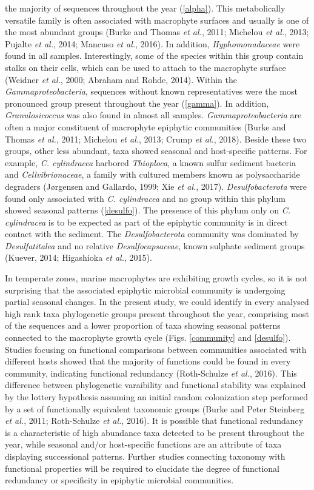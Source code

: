 \documentclass[12pt,]{article}
\begin{document}
the majority of sequences throughout the year (\autoref{alpha}). This
metabolically versatile family is often associated with macrophyte
surfaces and usually is one of the most abundant groups (Burke and
Thomas \emph{et al.}, 2011; Michelou \emph{et al.}, 2013; Pujalte
\emph{et al.}, 2014; Mancuso \emph{et al.}, 2016). In addition,
\emph{Hyphomonadaceae} were found in all samples. Interestingly, some of
the species within this group contain stalks on their cells, which can
be used to attach to the macrophyte surface (Weidner \emph{et al.},
2000; Abraham and Rohde, 2014). Within the \emph{Gammaproteobacteria},
sequences without known representatives were the most pronounced group
present throughout the year (\autoref{gamma}). In addition,
\emph{Granulosicoccus} was also found in almost all samples.
\emph{Gammaproteobacteria} are often a major constituent of macrophyte
epiphytic communities (Burke and Thomas \emph{et al.}, 2011; Michelou
\emph{et al.}, 2013; Crump \emph{et al.}, 2018). Beside these two
groups, other less abundant, taxa showed seasonal and host-specific
patterns. For example, \emph{C. cylindracea} harbored \emph{Thioploca},
a known sulfur sediment bacteria and \emph{Cellvibrionaceae}, a family
with cultured members known as polysaccharide degraders (Jørgensen and
Gallardo, 1999; Xie \emph{et al.}, 2017). \emph{Desulfobacterota} were
found only associated with \emph{C. cylindracea} and no group within
this phylum showed seasonal patterns (\autoref{desulfo}). The presence
of this phylum only on \emph{C. cylindracea} is to be expected as part
of the epiphytic community is in direct contact with the sediment. The
\emph{Desulfobacterota} community was dominated by \emph{Desulfatitalea}
and no relative \emph{Desulfocapsaceae}, known sulphate sediment groups
(Kuever, 2014; Higashioka \emph{et al.}, 2015).

In temperate zones, marine macrophytes are exhibiting growth cycles, so
it is not surprising that the associated epiphytic microbial community
is undergoing partial seasonal changes. In the present study, we could
identify in every analysed high rank taxa phylogenetic groups present
throughout the year, comprising most of the sequences and a lower
proportion of taxa showing seasonal patterns connected to the macrophyte
growth cycle (Figs. \ref{community} and \ref{desulfo}). Studies focusing
on functional comparisons between communities associated with different
hosts showed that the majority of functions could be found in every
community, indicating functional redundancy (Roth-Schulze \emph{et al.},
2016). This difference between phylogenetic varaibility and functional
stability was explained by the lottery hypothesis assuming an initial
random colonization step performed by a set of functionally equivalent
taxonomic groups (Burke and Peter Steinberg \emph{et al.}, 2011;
Roth-Schulze \emph{et al.}, 2016). It is possible that functional
redundancy is a characteristic of high abundance taxa detected to be
present throughout the year, while seasonal and/or host-specific
functions are an attribute of taxa displaying successional patterns.
Further studies connecting taxonomy with functional properties will be
required to elucidate the degree of functional redundancy or specificity
in epiphytic microbial communities.
\end{document}
